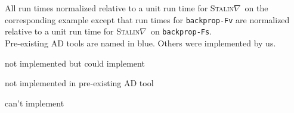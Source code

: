 \documentclass{article}
\newcommand{\red}{\color{Red}}
\newcommand{\green}{\color{Green}}
\newcommand{\blue}{\color{Blue}}
\newcommand{\Stalingrad}{\textsc{Stalin$\nabla$}}
\begin{document}
All run times normalized relative to a unit run time for \Stalingrad\ on
the corresponding example except that run times for \texttt{backprop-Fv}
are normalized relative to a unit run time for \Stalingrad\ on
\texttt{backprop-Fs}.\\
Pre-existing AD tools are named in {\blue blue}.
Others were implemented by us.
\begin{compactdesc}
\item[{\green\rule{1ex}{1ex}}] not implemented but could implement
\item[{\blue\rule{1ex}{1ex}}] not implemented in pre-existing AD tool
\item[{\red\rule{1ex}{1ex}}] can't implement
\end{compactdesc}
\end{document}
